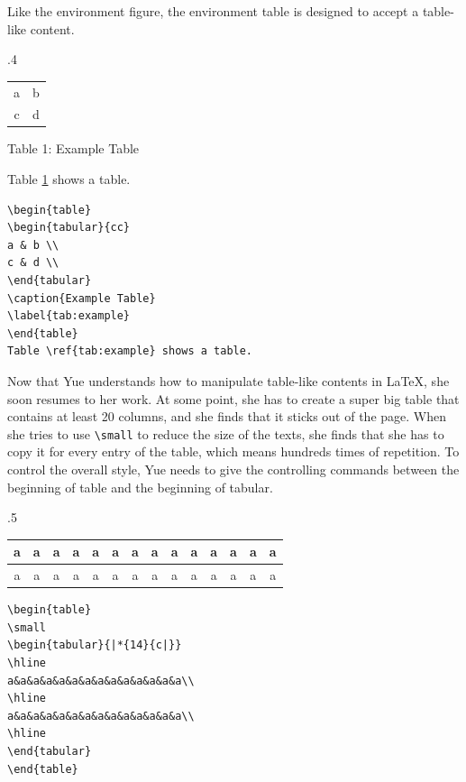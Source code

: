 Like the environment figure, the environment table is designed to accept a table-like content.
\begin{miniexammar}{.4\textandmarginlen}{
\begin{tabular}{cc}
a & b \\
c & d \\
\end{tabular}
\begin{center}
\hypertarget{fakedcaptiontab}{Table 1: Example Table}
\end{center}
Table \hyperlink{fakedcaptiontab}{1} shows a table.
}
\begin{lstlisting}
\begin{table}
\begin{tabular}{cc}
a & b \\
c & d \\
\end{tabular}
\caption{Example Table}
\label{tab:example}
\end{table}
Table \ref{tab:example} shows a table.
\end{lstlisting}
\end{miniexammar}

Now that Yue understands how to manipulate table-like contents in \LaTeX{}, she soon resumes to her work. At some point, she has to create a super big table that contains at least 20 columns, and she finds that it sticks out of the page. When she tries to use \verb=\small= to reduce the size of the texts, she finds that she has to copy it for every entry of the table, which means hundreds times of repetition. To control the overall style, Yue needs to give the controlling commands between the beginning of table and the beginning of tabular.

\begin{miniexammar}{.5\textandmarginlen}{
{
\scriptsize
\begin{tabular}{|*{14}{c|}}
\hline 
a&a&a&a&a&a&a&a&a&a&a&a&a&a\\
\hline
a&a&a&a&a&a&a&a&a&a&a&a&a&a\\
\hline
\end{tabular}
}
}
\begin{lstlisting}
\begin{table}
\small
\begin{tabular}{|*{14}{c|}}
\hline 
a&a&a&a&a&a&a&a&a&a&a&a&a&a\\
\hline
a&a&a&a&a&a&a&a&a&a&a&a&a&a\\
\hline
\end{tabular}
\end{table}
\end{lstlisting}
\end{miniexammar}

